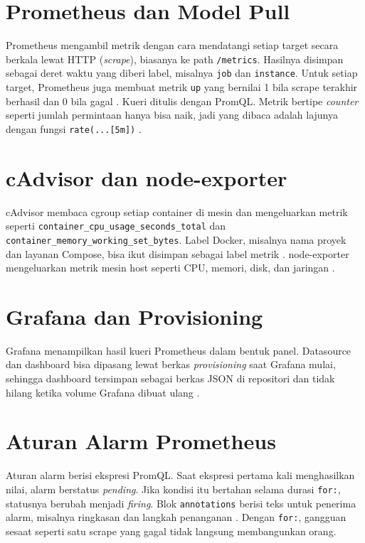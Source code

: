 \documentclass[a4paper,oneside,12pt]{report}
\begin{document}
\section{Prometheus dan Model Pull}
Prometheus mengambil metrik dengan cara mendatangi setiap target secara berkala lewat HTTP (\textit{scrape}), biasanya ke path \texttt{/metrics}. Hasilnya disimpan sebagai deret waktu yang diberi label, misalnya \texttt{job} dan \texttt{instance}. Untuk setiap target, Prometheus juga membuat metrik \texttt{up} yang bernilai 1 bila scrape terakhir berhasil dan 0 bila gagal \cite{prometheus-overview}. Kueri ditulis dengan PromQL. Metrik bertipe \textit{counter} seperti jumlah permintaan hanya bisa naik, jadi yang dibaca adalah lajunya dengan fungsi \texttt{rate(...[5m])} \cite{prometheus-rate}.

\section{cAdvisor dan node-exporter}
cAdvisor membaca cgroup setiap container di mesin dan mengeluarkan metrik seperti \texttt{container\_cpu\_usage\_seconds\_total} dan \texttt{container\_memory\_working\_set\_bytes}. Label Docker, misalnya nama proyek dan layanan Compose, bisa ikut disimpan sebagai label metrik \cite{cadvisor}. node-exporter mengeluarkan metrik mesin host seperti CPU, memori, disk, dan jaringan \cite{node-exporter}.

\section{Grafana dan Provisioning}
Grafana menampilkan hasil kueri Prometheus dalam bentuk panel. Datasource dan dashboard bisa dipasang lewat berkas \textit{provisioning} saat Grafana mulai, sehingga dashboard tersimpan sebagai berkas JSON di repositori dan tidak hilang ketika volume Grafana dibuat ulang \cite{grafana-provisioning}.

\section{Aturan Alarm Prometheus}
Aturan alarm berisi ekspresi PromQL. Saat ekspresi pertama kali menghasilkan nilai, alarm berstatus \textit{pending}. Jika kondisi itu bertahan selama durasi \texttt{for:}, statusnya berubah menjadi \textit{firing}. Blok \texttt{annotations} berisi teks untuk penerima alarm, misalnya ringkasan dan langkah penanganan \cite{prometheus-alerting}. Dengan \texttt{for:}, gangguan sesaat seperti satu scrape yang gagal tidak langsung membangunkan orang.
\end{document}

